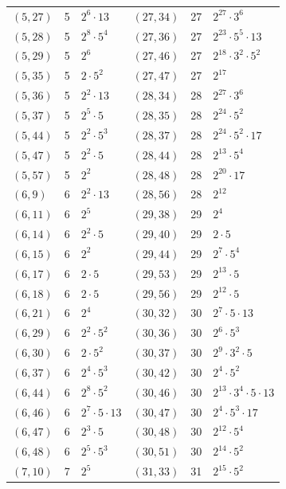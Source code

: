 \documentclass[11pt]{article}
\begin{document}
\begin{longtable}{@{}lrl@{\qquad}lrl@{}}
$(5,27)$ & 5 & $2^{6}\cdot 13$ & $(27,34)$ & 27 & $2^{27}\cdot 3^{6}$\\
$(5,28)$ & 5 & $2^{8}\cdot 5^{4}$ & $(27,36)$ & 27 & $2^{23}\cdot 5^{5}\cdot 13$\\
$(5,29)$ & 5 & $2^{6}$ & $(27,46)$ & 27 & $2^{18}\cdot 3^{2}\cdot 5^{2}$\\
$(5,35)$ & 5 & $2\cdot 5^{2}$ & $(27,47)$ & 27 & $2^{17}$\\
$(5,36)$ & 5 & $2^{2}\cdot 13$ & $(28,34)$ & 28 & $2^{27}\cdot 3^{6}$\\
$(5,37)$ & 5 & $2^{5}\cdot 5$ & $(28,35)$ & 28 & $2^{24}\cdot 5^{2}$\\
$(5,44)$ & 5 & $2^{2}\cdot 5^{3}$ & $(28,37)$ & 28 & $2^{24}\cdot 5^{2}\cdot 17$\\
$(5,47)$ & 5 & $2^{2}\cdot 5$ & $(28,44)$ & 28 & $2^{13}\cdot 5^{4}$\\
$(5,57)$ & 5 & $2^{2}$ & $(28,48)$ & 28 & $2^{20}\cdot 17$\\
$(6,9)$ & 6 & $2^{2}\cdot 13$ & $(28,56)$ & 28 & $2^{12}$\\
$(6,11)$ & 6 & $2^{5}$ & $(29,38)$ & 29 & $2^{4}$\\
$(6,14)$ & 6 & $2^{2}\cdot 5$ & $(29,40)$ & 29 & $2\cdot 5$\\
$(6,15)$ & 6 & $2^{2}$ & $(29,44)$ & 29 & $2^{7}\cdot 5^{4}$\\
$(6,17)$ & 6 & $2\cdot 5$ & $(29,53)$ & 29 & $2^{13}\cdot 5$\\
$(6,18)$ & 6 & $2\cdot 5$ & $(29,56)$ & 29 & $2^{12}\cdot 5$\\
$(6,21)$ & 6 & $2^{4}$ & $(30,32)$ & 30 & $2^{7}\cdot 5\cdot 13$\\
$(6,29)$ & 6 & $2^{2}\cdot 5^{2}$ & $(30,36)$ & 30 & $2^{6}\cdot 5^{3}$\\
$(6,30)$ & 6 & $2\cdot 5^{2}$ & $(30,37)$ & 30 & $2^{9}\cdot 3^{2}\cdot 5$\\
$(6,37)$ & 6 & $2^{4}\cdot 5^{3}$ & $(30,42)$ & 30 & $2^{4}\cdot 5^{2}$\\
$(6,44)$ & 6 & $2^{8}\cdot 5^{2}$ & $(30,46)$ & 30 & $2^{13}\cdot 3^{4}\cdot 5\cdot 13$\\
$(6,46)$ & 6 & $2^{7}\cdot 5\cdot 13$ & $(30,47)$ & 30 & $2^{4}\cdot 5^{3}\cdot 17$\\
$(6,47)$ & 6 & $2^{3}\cdot 5$ & $(30,48)$ & 30 & $2^{12}\cdot 5^{4}$\\
$(6,48)$ & 6 & $2^{5}\cdot 5^{3}$ & $(30,51)$ & 30 & $2^{14}\cdot 5^{2}$\\
$(7,10)$ & 7 & $2^{5}$ & $(31,33)$ & 31 & $2^{15}\cdot 5^{2}$\\

\end{longtable}
\end{document}
